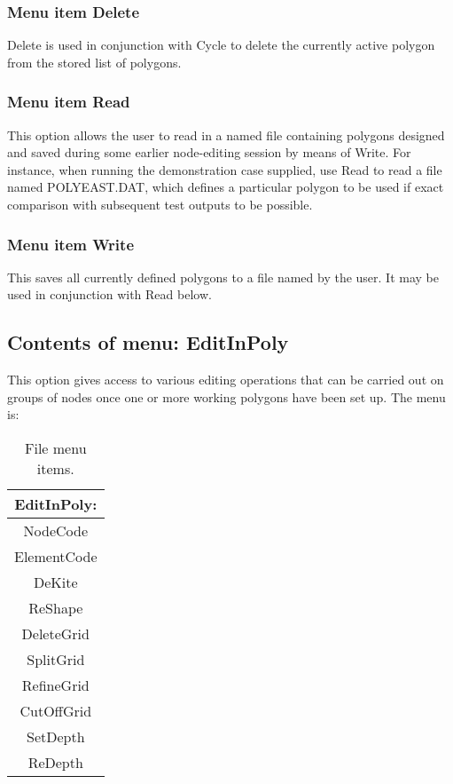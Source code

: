 \documentclass{article}
\begin{document}
\subsubsection[Menu item Delete]{Menu item Delete}
Delete is used in conjunction with Cycle to delete the currently active polygon from the stored list of polygons.

\subsubsection[Menu item Read]{Menu item Read}
This option allows the user to read in a named file containing polygons designed and saved during some earlier node-editing session by means of Write. For instance, when running the demonstration case supplied, use Read to read a file named POLYEAST.DAT, which defines a particular polygon to be used if exact comparison with subsequent test outputs to be possible.

\subsubsection[Menu item Write]{Menu item Write}
This saves all currently defined polygons to a file named by the user. It may be used in conjunction with Read below.

\subsection{Contents of menu: EditInPoly}
This option gives access to various editing operations that can be carried out on groups of nodes once one or more working polygons have been set up. The menu is:

\begin{table}[htb!]
 \caption{File menu items.}
  \begin{center}
   \begin{tabular}{|c|}
    \hline
EditInPoly:\\     \hline
NodeCode \\ ElementCode \\ DeKite \\ ReShape \\
DeleteGrid \\ SplitGrid \\ RefineGrid \\
CutOffGrid \\ SetDepth \\ ReDepth \\
    \hline
   \end{tabular}
   \label{tab:EDITINPOLY}
  \end{center}
\end{table}
\end{document}
